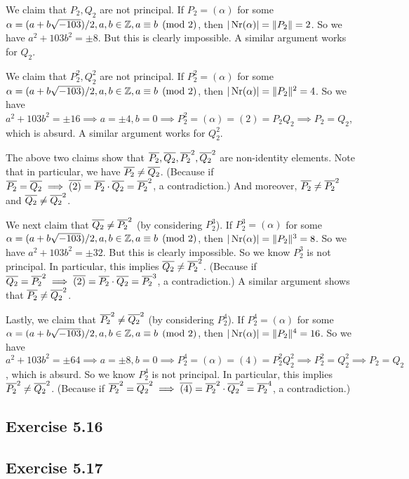 \documentclass[../Marcus.tex]{subfiles}
\begin{document}
We claim that $P_2,Q_2$ are not principal. If $P_2 = (\alpha)$ for some $\alpha=(a+b\sqrt{-103})/2,a,b\in \mathbb{Z},a \equiv b\pmod{2}$, then $|\operatorname{Nr}(\alpha)| = \|P_2\| = 2$. So we have $a^2+103b^2 = \pm8$. But this is clearly impossible. A similar argument works for $Q_2$.

We claim that $P_2^2,Q_2^2$ are not principal. If $P_2^2 = (\alpha)$ for some $\alpha=(a+b\sqrt{-103})/2,a,b\in \mathbb{Z},a \equiv b\pmod{2}$, then $|\operatorname{Nr}(\alpha)| = \|P_2\|^2 = 4$. So we have $a^2+103b^2 = \pm16 \implies a=\pm4,b=0 \implies P_2^2 = (\alpha) = (2) = P_2Q_2 \implies P_2=Q_2$, which is absurd. A similar argument works for $Q_2^2$.

The above two claims show that $\overline{P_2},\overline{Q_2},\overline{P_2}^2,\overline{Q_2}^2$ are non-identity elements. Note that in particular, we have $\overline{P_2}\neq\overline{Q_2}$. (Because if $\overline{P_2}=\overline{Q_2} \implies \overline{(2)} = \overline{P_2}\cdot\overline{Q_2} = \overline{P_2}^2$, a contradiction.) And moreover, $\overline{P_2}\neq\overline{P_2}^2$ and $\overline{Q_2}\neq\overline{Q_2}^2$.

We next claim that $\overline{Q_2}\neq\overline{P_2}^2$ (by considering $P_2^3$). If $P_2^3 = (\alpha)$ for some $\alpha=(a+b\sqrt{-103})/2,a,b\in \mathbb{Z},a \equiv b\pmod{2}$, then $|\operatorname{Nr}(\alpha)| = \|P_2\|^3 = 8$. So we have $a^2+103b^2 = \pm32$. But this is clearly impossible. So we know $P_2^3$ is not principal. In particular, this implies $\overline{Q_2}\neq\overline{P_2}^2$. (Because if $\overline{Q_2}=\overline{P_2}^2 \implies \overline{(2)} = \overline{P_2}\cdot\overline{Q_2} = \overline{P_2}^3$, a contradiction.) A similar argument shows that $\overline{P_2}\neq\overline{Q_2}^2$.

Lastly, we claim that $\overline{P_2}^2\neq\overline{Q_2}^2$ (by considering $P_2^4$). If $P_2^4 = (\alpha)$ for some $\alpha=(a+b\sqrt{-103})/2,a,b\in \mathbb{Z},a \equiv b\pmod{2}$, then $|\operatorname{Nr}(\alpha)| = \|P_2\|^4 = 16$. So we have $a^2+103b^2 = \pm64 \implies a=\pm8,b=0 \implies P_2^4 = (\alpha) = (4) = P_2^2Q_2^2 \implies P_2^2=Q_2^2 \implies P_2 = Q_2$, which is absurd. So we know $P_2^4$ is not principal. In particular, this implies $\overline{P_2}^2\neq\overline{Q_2}^2$. (Because if $\overline{P_2}^2=\overline{Q_2}^2 \implies \overline{(4)} = \overline{P_2}^2\cdot\overline{Q_2}^2 = \overline{P_2}^4$, a contradiction.)

\subsection*{Exercise 5.16}

\subsection*{Exercise 5.17}
\end{document}
